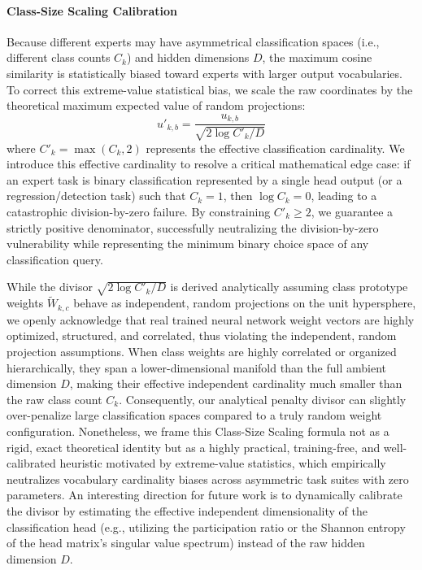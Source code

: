 \paragraph{Class-Size Scaling Calibration}
Because different experts may have asymmetrical classification spaces (i.e., different class counts $C_k$) and hidden dimensions $D$, the maximum cosine similarity is statistically biased toward experts with larger output vocabularies. To correct this extreme-value statistical bias, we scale the raw coordinates by the theoretical maximum expected value of random projections:
\begin{equation}
  u'_{k, b} = \frac{u_{k, b}}{\sqrt{2\log C'_k / D}}
\end{equation}
where $C'_k = \max(C_k, 2)$ represents the effective classification cardinality. We introduce this effective cardinality to resolve a critical mathematical edge case: if an expert task is binary classification represented by a single head output (or a regression/detection task) such that $C_k = 1$, then $\log C_k = 0$, leading to a catastrophic division-by-zero failure. By constraining $C'_k \ge 2$, we guarantee a strictly positive denominator, successfully neutralizing the division-by-zero vulnerability while representing the minimum binary choice space of any classification query.

While the divisor $\sqrt{2\log C'_k / D}$ is derived analytically assuming class prototype weights $\tilde{W}_{k,c}$ behave as independent, random projections on the unit hypersphere, we openly acknowledge that real trained neural network weight vectors are highly optimized, structured, and correlated, thus violating the independent, random projection assumptions. When class weights are highly correlated or organized hierarchically, they span a lower-dimensional manifold than the full ambient dimension $D$, making their effective independent cardinality much smaller than the raw class count $C_k$. Consequently, our analytical penalty divisor can slightly over-penalize large classification spaces compared to a truly random weight configuration. Nonetheless, we frame this Class-Size Scaling formula not as a rigid, exact theoretical identity but as a highly practical, training-free, and well-calibrated heuristic motivated by extreme-value statistics, which empirically neutralizes vocabulary cardinality biases across asymmetric task suites with zero parameters. An interesting direction for future work is to dynamically calibrate the divisor by estimating the effective independent dimensionality of the classification head (e.g., utilizing the participation ratio or the Shannon entropy of the head matrix's singular value spectrum) instead of the raw hidden dimension $D$.

